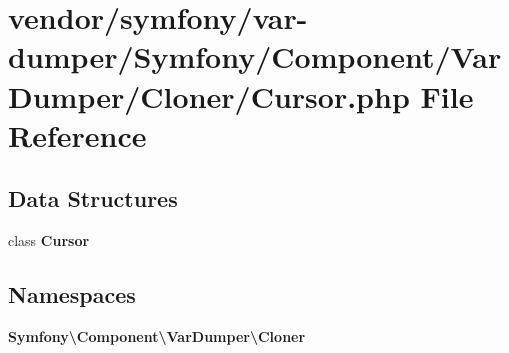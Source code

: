 \section{vendor/symfony/var-\/dumper/\+Symfony/\+Component/\+Var\+Dumper/\+Cloner/\+Cursor.php File Reference}
\label{_cursor_8php}
\subsection*{Data Structures}
\begin{DoxyCompactItemize}
\item 
class {\bf Cursor}
\end{DoxyCompactItemize}
\subsection*{Namespaces}
\begin{DoxyCompactItemize}
\item 
 {\bf Symfony\textbackslash{}\+Component\textbackslash{}\+Var\+Dumper\textbackslash{}\+Cloner}
\end{DoxyCompactItemize}
